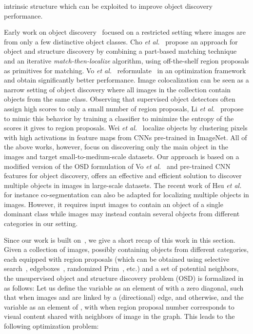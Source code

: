 \documentclass[runningheads]{llncs}
\begin{document}
intrinsic structure which can be exploited to improve object discovery performance. 

Early work on object discovery~\cite{faktor2012clustering,grauman2006unsupervised,kim2009unsupervised,Russell06,ICCV/SivicREZF05} focused on a restricted setting where images are from only a few distinctive object classes.  Cho {\em et al.}~\cite{CKSP15} propose an approach for object and structure discovery by combining a part-based matching technique and an iterative \textit{match-then-localize} algorithm, using off-the-shelf region proposals as primitives for matching. Vo {\em et al.}~\cite{Vo2019UnsupOptim} reformulate~\cite{CKSP15} in an optimization framework and obtain significantly better performance. Image colocalization can be seen as a narrow setting of object discovery where all images in the collection contain objects from the same class. Observing that supervised object detectors often assign high scores to only a small number of region proposals, Li {\em et al.}~\cite{Li2016mimick} propose to mimic this behavior by training a classifier to minimize the entropy of the scores it gives to region proposals. Wei {\em et al.}~\cite{Wei2019ddtplus} localize objects by clustering pixels with high activations in feature maps from CNNs pre-trained in ImageNet. All of the above works, however, focus on discovering only the main object in the images and target small-to-medium-scale datasets. Our approach is based on a modified version of the OSD formulation of Vo {\em et al.}~\cite{Vo2019UnsupOptim} and pre-trained CNN features for object discovery, offers an effective and efficient solution to discover multiple objects in images in large-scale datasets. The recent work of Hsu {\em et al.}~\cite{HsuCVPR19DeepCO3} for instance co-segmentation can also be adapted for localizing multiple objects in images. However, it requires input images to contain an object of a single dominant class while images may instead contain several objects from different categories in our setting. 


 Since our work is built on~\cite{Vo2019UnsupOptim}, we give a short recap of this work in this section. Given a collection of  images, possibly containing objects from different categories, each equipped with  region proposals (which can be obtained using selective search~\cite{uijlings2013selective}, edgeboxes~\cite{zitnick2014edge}, randomized Prim~\cite{Manen2013prim}, etc.) and a set of potential neighbors, the unsupervised object and structure discovery problem (OSD) is formalized in~\cite{Vo2019UnsupOptim} as follows: Let us define the variable  as an element of  with a zero diagonal, such that  when images  and 
are linked by a (directional) edge, and  otherwise, and the variable  as an element of , with  when region proposal number  corresponds to visual content shared with neighbors of image  in the graph. This leads to the following optimization problem:
\end{document}
